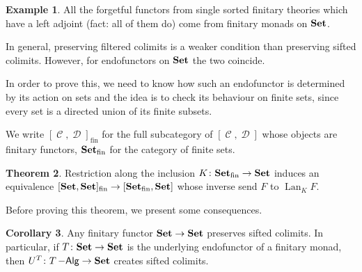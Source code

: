 \documentclass[a4paper,11pt,oneside,openany]{scrbook}
\newcommand{\catname}[1]{{\normalfont\textbf{#1}}}
\DeclareMathOperator{\Alg}{-\mathsf{Alg}}
\newcommand{\Set}{\catname{Set}}
\DeclareMathOperator{\C}{\mathcal{C}}
\DeclareMathOperator{\D}{\mathcal{D}}
\DeclareMathOperator{\Lan}{Lan}
\theoremstyle{definition}
\newtheorem{thm}{Theorem}[section] %
\theoremstyle{definition}
\newtheorem{cor}[thm]{Corollary}
\newtheorem{exmp}[thm]{Example}
\begin{document}
\begin{exmp}
	All the forgetful functors from single sorted finitary theories which have a left adjoint (fact: all of them do) come from finitary monads on $\Set$.
\end{exmp}

	In general, preserving filtered colimits is a weaker condition than preserving sifted colimits. However, for endofunctors on $\Set$ the two coincide.

	In order to prove this, we need to know how such an endofunctor is determined by its action on sets and the idea is to check its behaviour on finite sets, since every set is a directed union of its finite subsets.
	
	We write $[\C,\D]_\text{fin}$ for the full subcategory of $[\C,\D]$ whose objects are finitary functors, $\Set_\text{fin}$ for the category of finite sets.
	
	\begin{thm}
		Restriction along the inclusion $K\colon\Set_\text{fin}\rightarrow\Set$ induces an equivalence $[\Set,\Set]_\text{fin}\rightarrow[\Set_\text{fin},\Set]$ whose inverse send $F$ to $\Lan_KF$.
	\end{thm}

Before proving this theorem, we present some consequences.

\begin{cor}
	Any finitary functor $\Set\rightarrow\Set$ preserves sifted colimits. In particular, if $T\colon\Set\rightarrow\Set$ is the underlying endofunctor of a finitary monad, then $U^T\colon T\Alg\rightarrow\Set$ creates sifted colimits.
\end{cor}
\end{document}
